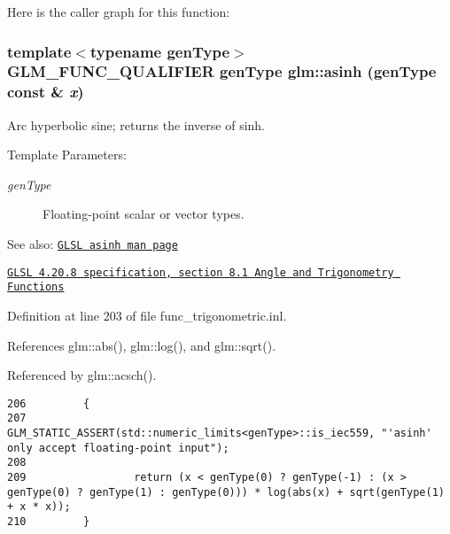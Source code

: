 Here is the caller graph for this function:\hypertarget{group__core__func__trigonometric_gaedecffe9a7c10e5930c4ec938a0ca2e}{
\subsubsection[asinh]{\setlength{\rightskip}{0pt plus 5cm}template$<$typename genType$>$ GLM\_\-FUNC\_\-QUALIFIER genType glm::asinh (genType const \& {\em x})}}
\label{group__core__func__trigonometric_gaedecffe9a7c10e5930c4ec938a0ca2e}


Arc hyperbolic sine; returns the inverse of sinh.

\begin{Desc}
\item[Template Parameters:]
\begin{description}
\item[{\em genType}]Floating-point scalar or vector types.\end{description}
\end{Desc}
\begin{Desc}
\item[See also:]\href{http://www.opengl.org/sdk/docs/manglsl/xhtml/asinh.xml}{\tt GLSL asinh man page} 

\href{http://www.opengl.org/registry/doc/GLSLangSpec.4.20.8.pdf}{\tt GLSL 4.20.8 specification, section 8.1 Angle and Trigonometry Functions} \end{Desc}


Definition at line 203 of file func\_\-trigonometric.inl.

References glm::abs(), glm::log(), and glm::sqrt().

Referenced by glm::acsch().

\begin{Code}\begin{verbatim}206         {
207                 GLM_STATIC_ASSERT(std::numeric_limits<genType>::is_iec559, "'asinh' only accept floating-point input");
208                 
209                 return (x < genType(0) ? genType(-1) : (x > genType(0) ? genType(1) : genType(0))) * log(abs(x) + sqrt(genType(1) + x * x));
210         }
\end{verbatim}
\end{Code}




